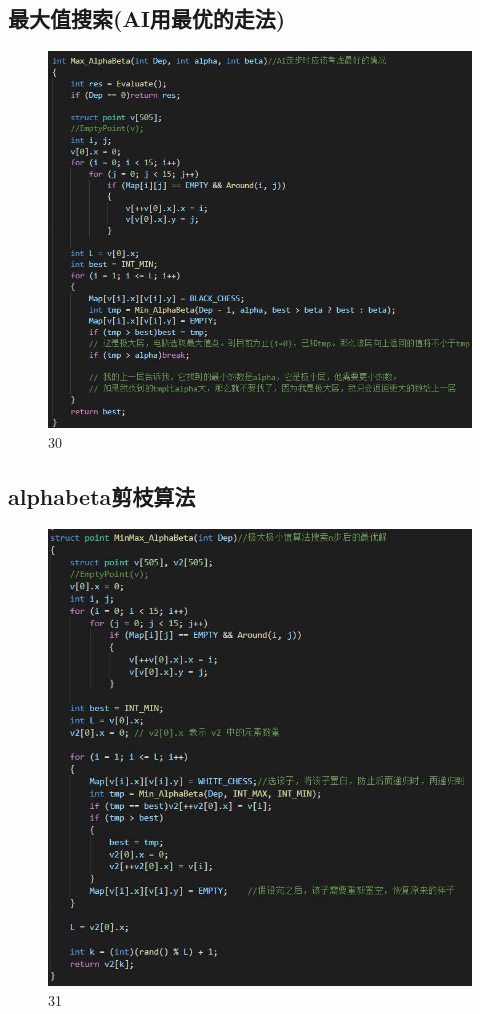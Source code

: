 \documentclass[UTF8]{ctexart}
\begin{document}
\subsection{最大值搜索(AI用最优的走法)}
\begin{figure}[H]
    \centering
    \includegraphics[scale=0.8]{29.jpg}
\caption{30}
\end{figure}
\subsection{alphabeta剪枝算法}
\begin{figure}[H]
    \centering
    \includegraphics[scale=0.9]{30.jpg}
\caption{31}
\end{figure}
\end{document}
